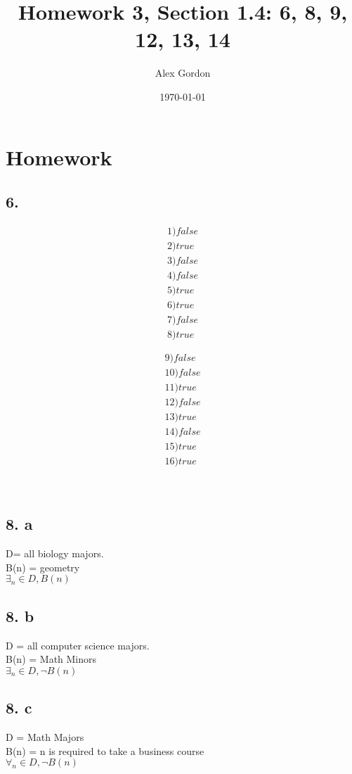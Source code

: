 \documentclass[12]{scrartcl}
\begin{document}
\title{Homework 3, Section 1.4: 6, 8, 9, 12, 13, 14 }
\author{Alex Gordon}
\date{\today}
\maketitle
\section*{Homework}
\subsection*{6.}
\begin{multicols}{2}
\begin{align*}
1) false\\2) true\\3) false\\4) false\\5) true\\6) true\\7) false\\8) true\\
\end{align*}
\begin{align*}
\\9) false\\10) false\\11) true \\12) false\\13) true\\14) false\\15) true\\16) true
\end{align*}
\end{multicols}\

\subsection*{8. a}
D= all biology majors. \\
B(n) = geometry\\
$\exists_n \in D, B(n)$
\subsection*{8. b}
D = all computer science majors. \\
B(n) = Math Minors\\
$\exists_n \in D, \neg B(n)$
\subsection*{8. c}
D = Math Majors \\
B(n) = n is required to take a business course\\
$\forall_n \in D, \neg B(n)$
\end{document}
